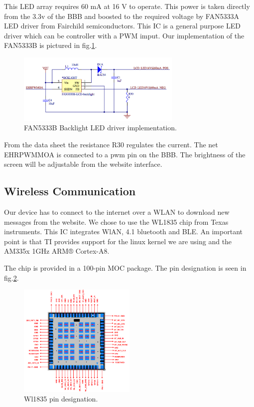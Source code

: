 This LED array requires 60 mA at 16 V to operate. This power is taken directly from the 3.3v of the BBB and boosted to the required voltage by FAN5333A LED driver from Fairchild semiconductors.
This IC is a general purpose LED driver which can be controller with a PWM imput.
Our implementation of the FAN5333B is pictured in fig.\ref{fig:backlight driver schematics}.

\begin{figure}[!htb]
    \centering
    \includegraphics[width=0.7\textwidth,keepaspectratio]{chap/hardFig/backlight_led_driver_sch}
    \caption{FAN5333B Backlight LED driver implementation.}
    \label{fig:backlight driver schematics}
\end{figure}

From the data sheet the resistance R30 regulates the current. The net EHRPWMMOA is connected to a pwm pin on the BBB. The brightness of the screen will be adjustable from the website interface.
\subsection{Wireless Communication}
\label{chap:wireless com}
Our device has to connect to the internet over a WLAN to download new messages from the website. We chose to use the WL1835 chip from Texas instruments. This IC integrates WlAN, 4.1 bluetooth and BLE. An important point is that TI provides support for the linux kernel we are using and the AM335x 1GHz ARM® Cortex-A8.

The chip is provided in a 100-pin MOC package. The pin designation is seen in fig.\ref{fig:wl1835 pin designation}.

\begin{figure}[!htb]
    \centering
    \includegraphics[width=0.5\textwidth,keepaspectratio]{chap/hardFig/100_pin_MOC_wl1835_package}
    \caption{Wl1835 pin designation.}
    \label{fig:wl1835 pin designation}
\end{figure}

